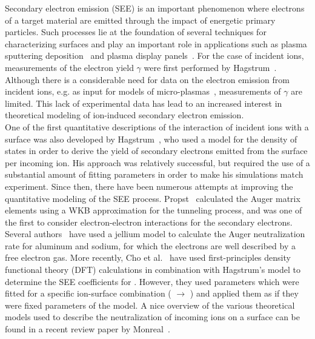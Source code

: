 \begin{refsection}

Secondary electron emission (SEE) is an important phenomenon where electrons of a target material are emitted through the impact of energetic primary particles. Such processes lie at the foundation of several techniques for characterizing surfaces and play an important role in applications such as plasma sputtering deposition~\cite{Depla2006, Depla2009} and plasma display panels~\cite{Motoyama2006, Cho2007}. For the case of incident ions, measurements of the electron yield $\gamma$ were first performed by Hagstrum~\cite{Hagstrum1953, Hagstrum1960}. Although there is a considerable need for data on the electron emission from incident ions, e.g. as input for models of micro-plasmas~\cite{Kothnur2003, Kothnur2005}, measurements of $\gamma$ are limited. This lack of experimental data has lead to an increased interest in theoretical modeling of ion-induced secondary electron emission.\\

One of the first quantitative descriptions of the interaction of incident ions with a surface was also developed by Hagstrum~\cite{Hagstrum1954, Hagstrum1961}, who used a model for the density of states in order to derive the yield of secondary electrons emitted from the surface per incoming ion. His approach was relatively successful, but required the use of a substantial amount of fitting parameters in order to make his simulations match experiment. Since then, there have been numerous attempts at improving the quantitative modeling of the SEE process. Propst~\cite{Propst1963} calculated the Auger matrix elements using a WKB approximation for the tunneling process, and was one of the first to consider electron-electron interactions for the secondary electrons. Several authors~\cite{Almulhem1989, Lorente1994, Monreal1995} have used a jellium model to calculate the Auger neutralization rate for aluminum and sodium, for which the electrons are well described by a free electron gas. More recently, Cho et al.~\cite{Cho2007} have used first-principles density functional theory (DFT) calculations in combination with Hagstrum's model to determine the SEE coefficients for . However, they used parameters which were fitted for a specific ion-surface combination ( $\rightarrow$ ) and applied them as if they were fixed parameters of the model. A nice overview of the various theoretical models used to describe the neutralization of incoming ions on a surface can be found in a recent review paper by Monreal~\cite{Monreal2014}. \\


\end{refsection}
